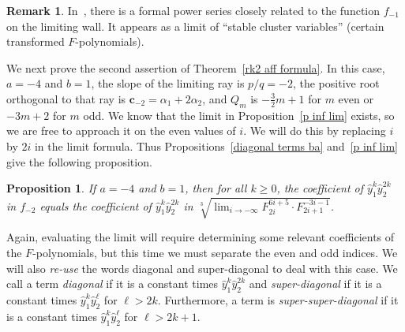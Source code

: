 \documentclass[10pt,a4paper]{amsart}
\newtheorem{prop}[theorem]{Proposition}
\theoremstyle{definition}
\newtheorem{rema}[theorem]{Remark}
\newcommand{\newword}[1]{\emph{#1}}
\newcommand{\p}{{\mathfrak p}}
\newcommand{\cc}{\mathbf{c}}
\newcommand{\hy}{\hat{y}}
\begin{document}
\begin{rema}\label{UMN REU}
In~\cite{Zhang}, there is a formal power series closely related to the function $f_{-1}$ on the limiting wall.
It appears as a limit of ``stable cluster variables'' (certain transformed $F$-polynomials). 
\end{rema}

We next prove the second assertion of Theorem~\ref{rk2 aff formula}.
In this case, $a=-4$ and $b=1$, the slope of the limiting ray is $p/q=-2$, the positive root orthogonal to that ray is $\cc_{-2}=\alpha_1+2\alpha_2$, and $Q_m$ is $-\frac32m+1$ for $m$ even or $-3m+2$ for $m$ odd.
We know that the limit in Proposition~\ref{p inf lim} exists, so we are free to approach it on the even values of $i$.
We will do this by replacing $i$ by $2i$ in the limit formula.
Thus Propositions~\ref{diagonal terms ba} and~\ref{p inf lim} give the following proposition.
\begin{prop}\label{diagonal terms asym}
If $a=-4$ and $b=1$, then for all $k\ge0$, the coefficient of $\hy_1^k\hy_2^{2k}$ in $f_{-2}$ equals the coefficient of $\hy_1^k\hy_2^{2k}$ in $\sqrt[3]{\lim_{i\to-\infty}F_{2i}^{6i+5}\cdot F_{2i+1}^{-3i-1}}$.
\end{prop}

Again, evaluating the limit will require determining some relevant coefficients of the $F$-polynomials, but this time we must separate the even and odd indices.
We will also \emph{re-use} the words diagonal and super-diagonal to deal with this case.
We call a term \newword{diagonal} if it is a constant times $\hy_1^k\hy_2^{2k}$ and \newword{super-diagonal} if it is a constant times $\hy_1^k\hy_2^\ell$ for $\ell>2k$.
Furthermore, a term is \newword{super-super-diagonal} if it is a constant times $\hy_1^k\hy_2^\ell$ for $\ell>2k+1$.
\end{document}
